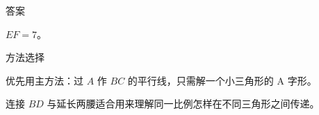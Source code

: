 \documentclass{exam-zh}
\begin{document}
\begin{eduBottomGrid}
  \begin{eduSummaryLeft}
    \begin{eduSummaryBlock}{\eduIconCheck}{答案}
    \begin{eduPlainList}
      \item $EF=7$。    \end{eduPlainList}
    \end{eduSummaryBlock}
  \end{eduSummaryLeft}
  \eduSummaryDivider
  \begin{eduSummaryRight}
    \begin{eduSummaryBlock}{\eduIconPin}{方法选择}
    \begin{eduBulletList}
      \item 优先用主方法：过 $A$ 作 $BC$ 的平行线，只需解一个小三角形的 A 字形。      \item 连接 $BD$ 与延长两腰适合用来理解同一比例怎样在不同三角形之间传递。    \end{eduBulletList}
    \end{eduSummaryBlock}
  \end{eduSummaryRight}
\end{eduBottomGrid}
\end{document}
